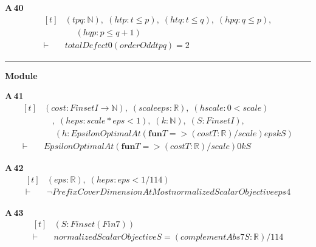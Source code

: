 \noindent\textbf{A\,40}\quad{}
{\footnotesize\[ \begin{aligned}[t]
&(\mathit{t} \mathit{p} \mathit{q} : \mathbb{N} ),\; (\mathit{htp} : \mathit{t} \leq \mathit{p}),\; (\mathit{htq} : \mathit{t} \leq \mathit{q}),\; (\mathit{hpq} : \mathit{q} \leq \mathit{p}),\\
&\quad \; (\mathit{hqp} : \mathit{p} \leq \mathit{q} + 1)\\
\vdash\;&\mathit{totalDefect} 0 (\mathit{orderOdd} \mathit{t} \mathit{p} \mathit{q}) = 2
\end{aligned} \]}

\vspace{4pt}\noindent\rule{\columnwidth}{0.4pt}\par\vspace{2pt}
\noindent\textbf{Module }\par\vspace{3pt}

\noindent\textbf{A\,41}\quad{}
{\footnotesize\[ \begin{aligned}[t]
&(\mathit{cost} : \mathit{Finset} \mathit{I} \to \mathbb{N} ),\; (\mathit{scale} \mathit{eps} : \mathbb{R} ),\; (\mathit{hscale} : 0 < \mathit{scale})\\
&\quad ,\; (\mathit{heps} : \mathit{scale} * \mathit{eps} < 1),\; (\mathit{k} : \mathbb{N} ),\; (\mathit{S} : \mathit{Finset} \mathit{I}),\\
&\quad \; (\mathit{h} : \mathit{EpsilonOptimalAt} (\mathbf{fun} \mathit{T} => (\mathit{cost} \mathit{T}:\mathbb{R} )/\mathit{scale}) \mathit{eps} \mathit{k} \mathit{S})\\
\vdash\;&\mathit{EpsilonOptimalAt} (\mathbf{fun} \mathit{T} => (\mathit{cost} \mathit{T}:\mathbb{R} )/\mathit{scale}) 0 \mathit{k} \mathit{S}
\end{aligned} \]}

\noindent\textbf{A\,42}\quad{}
{\footnotesize\[ \begin{aligned}[t]
&(\mathit{eps} : \mathbb{R} ),\; (\mathit{heps} : \mathit{eps} < 1/114)\\
\vdash\;&\neg \mathit{PrefixCoverDimensionAtMost} \mathit{normalizedScalarObjective} \mathit{eps} 4
\end{aligned} \]}

\noindent\textbf{A\,43}\quad{}
{\footnotesize\[ \begin{aligned}[t]
&(\mathit{S} : \mathit{Finset} (\mathit{Fin} 7))\\
\vdash\;&\mathit{normalizedScalarObjective} \mathit{S} = (\mathit{complementAbs7} \mathit{S}:\mathbb{R} )/114
\end{aligned} \]}

